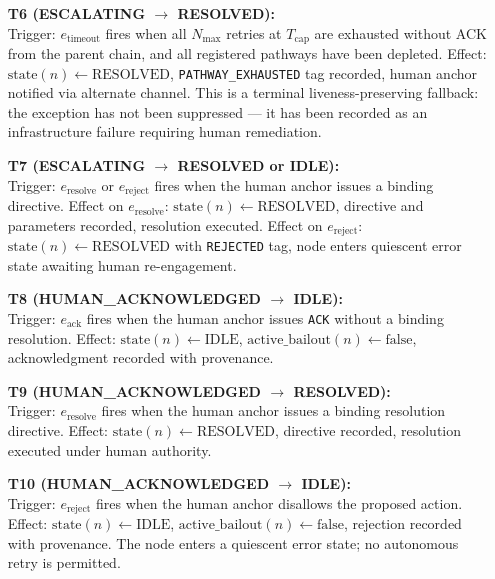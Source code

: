 \begin{enumerate}
\item[\textbf{T6 (ESCALATING $\rightarrow$ RESOLVED):}] \hfill \\ Trigger: $e_{\text{timeout}}$ fires when all $N_{\max}$ retries at $T_{\text{cap}}$ are exhausted without ACK from the parent chain, and all registered pathways have been depleted. Effect: $\text{state}(n) \leftarrow \text{RESOLVED}$, \texttt{PATHWAY\_EXHAUSTED} tag recorded, human anchor notified via alternate channel. This is a terminal liveness-preserving fallback: the exception has not been suppressed — it has been recorded as an infrastructure failure requiring human remediation.

\item[\textbf{T7 (ESCALATING $\rightarrow$ RESOLVED or IDLE):}] \hfill \\ Trigger: $e_{\text{resolve}}$ or $e_{\text{reject}}$ fires when the human anchor issues a binding directive. Effect on $e_{\text{resolve}}$: $\text{state}(n) \leftarrow \text{RESOLVED}$, directive and parameters recorded, resolution executed. Effect on $e_{\text{reject}}$: $\text{state}(n) \leftarrow \text{RESOLVED}$ with \texttt{REJECTED} tag, node enters quiescent error state awaiting human re-engagement.

\item[\textbf{T8 (HUMAN\_ACKNOWLEDGED $\rightarrow$ IDLE):}] \hfill \\ Trigger: $e_{\text{ack}}$ fires when the human anchor issues \texttt{ACK} without a binding resolution. Effect: $\text{state}(n) \leftarrow \text{IDLE}$, $\text{active\_bailout}(n) \leftarrow \text{false}$, acknowledgment recorded with provenance.

\item[\textbf{T9 (HUMAN\_ACKNOWLEDGED $\rightarrow$ RESOLVED):}] \hfill \\ Trigger: $e_{\text{resolve}}$ fires when the human anchor issues a binding resolution directive. Effect: $\text{state}(n) \leftarrow \text{RESOLVED}$, directive recorded, resolution executed under human authority.

\item[\textbf{T10 (HUMAN\_ACKNOWLEDGED $\rightarrow$ IDLE):}] \hfill \\ Trigger: $e_{\text{reject}}$ fires when the human anchor disallows the proposed action. Effect: $\text{state}(n) \leftarrow \text{IDLE}$, $\text{active\_bailout}(n) \leftarrow \text{false}$, rejection recorded with provenance. The node enters a quiescent error state; no autonomous retry is permitted.
\end{enumerate}

